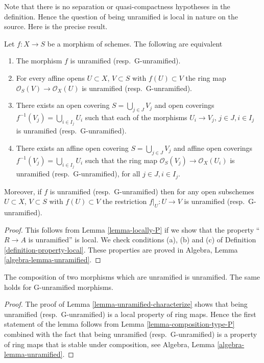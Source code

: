 \noindent
Note that there is no separation or quasi-compactness hypotheses in the
definition. Hence the question of being unramified is local in nature on
the source. Here is the precise result.

\begin{lemma}
\label{lemma-unramified-characterize}
Let $f : X \to S$ be a morphism of schemes.
The following are equivalent
\begin{enumerate}
\item The morphism $f$ is unramified (resp.\ G-unramified).
\item For every affine opens $U \subset X$, $V \subset S$
with $f(U) \subset V$ the ring map
$\mathcal{O}_S(V) \to \mathcal{O}_X(U)$ is unramified (resp.\ G-unramified).
\item There exists an open covering $S = \bigcup_{j \in J} V_j$
and open coverings $f^{-1}(V_j) = \bigcup_{i \in I_j} U_i$ such
that each of the morphisms $U_i \to V_j$, $j\in J, i\in I_j$
is unramified (resp.\ G-unramified).
\item There exists an affine open covering $S = \bigcup_{j \in J} V_j$
and affine open coverings $f^{-1}(V_j) = \bigcup_{i \in I_j} U_i$ such
that the ring map $\mathcal{O}_S(V_j) \to \mathcal{O}_X(U_i)$ is
unramified (resp.\ G-unramified), for all $j\in J, i\in I_j$.
\end{enumerate}
Moreover, if $f$ is unramified (resp.\ G-unramified) then for
any open subschemes $U \subset X$, $V \subset S$ with $f(U) \subset V$
the restriction $f|_U : U \to V$ is unramified (resp.\ G-unramified).
\end{lemma}

\begin{proof}
This follows from Lemma \ref{lemma-locally-P} if we show that
the property ``$R \to A$ is unramified'' is local.
We check conditions (a), (b) and (c) of Definition
\ref{definition-property-local}.
These properties are proved in
Algebra, Lemma \ref{algebra-lemma-unramified}.
\end{proof}

\begin{lemma}
\label{lemma-composition-unramified}
The composition of two morphisms which are unramified is unramified.
The same holds for G-unramified morphisms.
\end{lemma}

\begin{proof}
The proof of Lemma \ref{lemma-unramified-characterize}
shows that being unramified (resp.\ G-unramified)
is a local property of ring maps.
Hence the first statement of the lemma follows from
Lemma \ref{lemma-composition-type-P} combined
with the fact that being unramified (resp.\ G-unramified)
is a property of ring maps that is stable under composition, see
Algebra, Lemma \ref{algebra-lemma-unramified}.
\end{proof}

